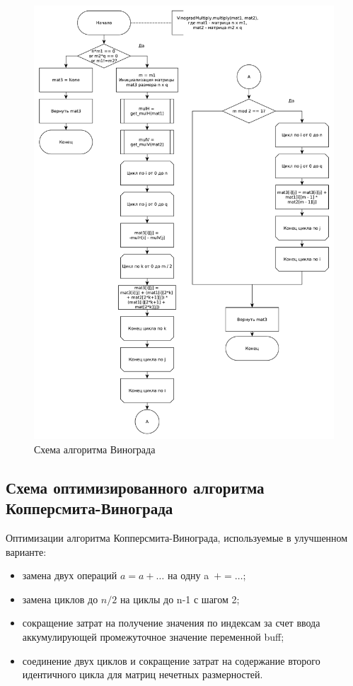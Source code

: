 \documentclass[12pt]{report}
\begin{document}
    \begin{figure}[H]
        \centering
        \includegraphics[width=0.85\linewidth]{img/vinograd}
        \caption{
                Схема алгоритма Винограда
            }
        \label{fig:vinograd}
    \end{figure}

    \subsection{Схема оптимизированного алгоритма Копперсмита-Винограда}
    Оптимизации алгоритма Копперсмита-Винограда, используемые в улучшенном варианте:
    \begin{itemize}
        \item замена двух операций $a = a + \ldots$ на одну a~$+= \ldots$;
        \item замена циклов до $n/2$ на циклы до n-1 с шагом 2;
        \item сокращение затрат на получение значения по индексам за счет ввода
        аккумулирующей промежуточное значение переменной buff;
        \item соединение двух циклов и сокращение затрат на содержание второго
        идентичного цикла для матриц нечетных размерностей.
    \end{itemize}
\end{document}
